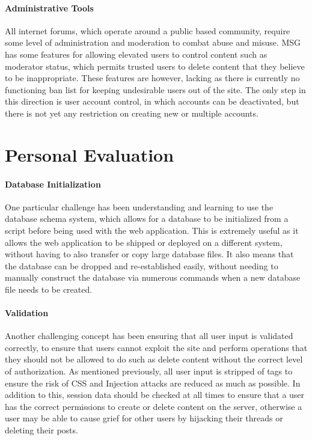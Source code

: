 \documentclass[10pt, a4paper]{article}
\begin{document}
	\paragraph{Administrative Tools}
	All internet forums, which operate around a public based community, require some level of administration and moderation to combat abuse and misuse. MSG has some features for allowing elevated users to control content such as moderator status, which permits trusted users to delete content that they believe to be inappropriate. These features are however, lacking as there is currently no functioning ban list for keeping undesirable users out of the site. The only step in this direction is user account control, in which accounts can be deactivated, but there is not yet any restriction on creating new or multiple accounts. 
	\section{Personal Evaluation}
	\paragraph{Database Initialization}
	One particular challenge has been understanding and learning to use the database schema system, which allows for a database to be initialized from a script before being used with the web application. This is extremely useful as it allows the web application to be shipped or deployed on a different system, without having to also transfer or copy large database files.
	It also means that the database can be dropped and re-established easily, without needing to manually construct the database via numerous commands when a new database file needs to be created.
	\paragraph{Validation}
	Another challenging concept has been ensuring that all user input is validated correctly, to ensure that users cannot exploit the site and perform operations that they should not be allowed to do such as delete content without the correct level of authorization. As mentioned previously, all user input is stripped of tags to ensure the risk of CSS and Injection attacks are reduced as much as possible. In addition to this, session data should be checked at all times to ensure that a user has the correct permissions to create or delete content on the server, otherwise a user may be able to cause grief for other users by hijacking their threads or deleting their posts.
\end{document}
